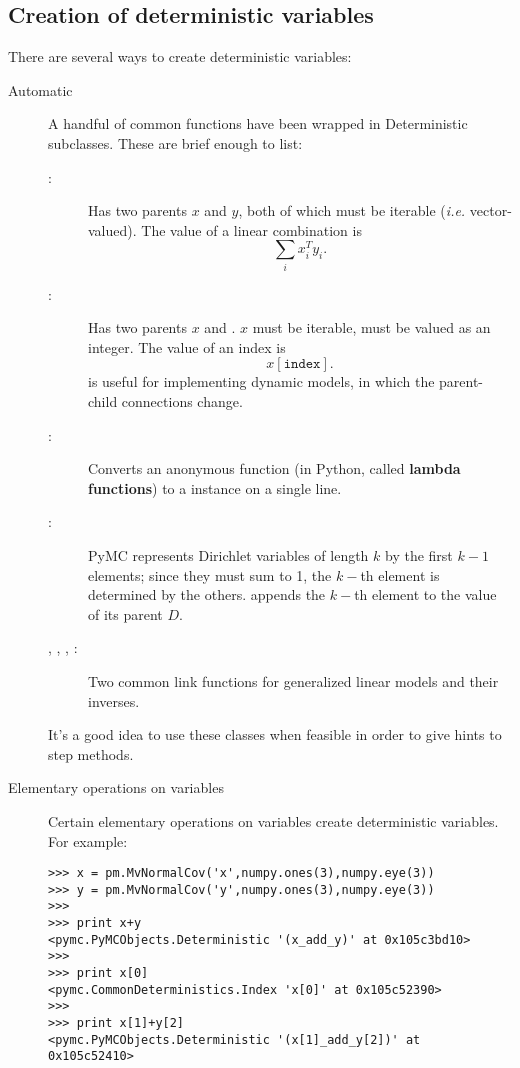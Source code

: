 \subsection{Creation of deterministic variables}
There are several ways to create deterministic variables:
\begin{description}
   \item[Automatic] A handful of common functions have been wrapped in Deterministic subclasses. These are brief enough to list:
   \begin{description}
      \item[:] Has two parents $x$ and $y$, both of which must be iterable (\emph{i.e.} vector-valued). The value of a linear combination is
      \[
      \sum_i x_i^T y_i.
      \]
      \item[:] Has two parents $x$ and . $x$ must be iterable,  must be valued as an integer. The value of an index is
      \[
      x[\mathtt{index}].
      \]
       is useful for implementing dynamic models, in which the parent-child connections change.
      \item[:] Converts an anonymous function (in Python, called \textbf{lambda functions}) to a  instance on a single line.
      \item[:] PyMC represents Dirichlet variables of length $k$ by the first $k-1$ elements; since they must sum to 1, the $k-$th element is determined by the others.  appends the $k-$th element to the value of its parent $D$.
      \item[, , , :] Two common link functions for generalized linear models and their inverses.
   \end{description}
   It's a good idea to use these classes when feasible in order to give hints to step methods.

   \item[Elementary operations on variables] Certain elementary operations on variables create deterministic variables. For example:   
\begin{verbatim}
>>> x = pm.MvNormalCov('x',numpy.ones(3),numpy.eye(3))
>>> y = pm.MvNormalCov('y',numpy.ones(3),numpy.eye(3))
>>>
>>> print x+y
<pymc.PyMCObjects.Deterministic '(x_add_y)' at 0x105c3bd10>
>>>
>>> print x[0]
<pymc.CommonDeterministics.Index 'x[0]' at 0x105c52390>
>>>
>>> print x[1]+y[2]
<pymc.PyMCObjects.Deterministic '(x[1]_add_y[2])' at 0x105c52410>
\end{verbatim}


\end{description}
